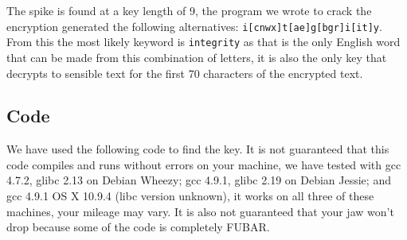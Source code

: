 The spike is found at a key length of 9, the program we wrote to crack the encryption generated the following alternatives: \texttt{i[cnwx]t[ae]g[bgr]i[it]y}. From this the most likely keyword is \texttt{integrity} as that is the only English word that can be made from this combination of letters, it is also the only key that decrypts to sensible text for the first 70 characters of the encrypted text.

\subsection{Code}
We have used the following code to find the key. It is not guaranteed that this code compiles and runs without errors on your machine, we have tested with gcc 4.7.2, glibc 2.13 on Debian Wheezy; gcc 4.9.1, glibc 2.19 on Debian Jessie; and gcc 4.9.1 OS X 10.9.4 (libc version unknown), it works on all three of these machines, your mileage may vary. It is also not guaranteed that your jaw won't drop because some of the code is completely FUBAR.


